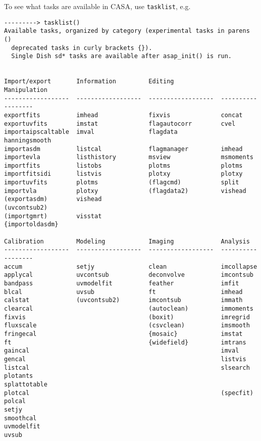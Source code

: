 To see what tasks are available in CASA, use {\tt tasklist}, e.g.
\small
\begin{verbatim}
---------> tasklist()
Available tasks, organized by category (experimental tasks in parens ()
  deprecated tasks in curly brackets {}).
  Single Dish sd* tasks are available after asap_init() is run. 


Import/export       Information         Editing             Manipulation      
------------------  ------------------  ------------------  ------------------
exportfits          imhead              fixvis              concat            
exportuvfits        imstat              flagautocorr        cvel              
importaipscaltable  imval               flagdata            hanningsmooth     
importasdm          listcal             flagmanager         imhead            
importevla          listhistory         msview              msmoments         
importfits          listobs             plotms              plotms            
importfitsidi       listvis             plotxy              plotxy            
importuvfits        plotms              (flagcmd)           split             
importvla           plotxy              (flagdata2)         vishead           
(exportasdm)        vishead                                 (uvcontsub2)      
(importgmrt)        visstat                                                   
{importoldasdm}                                                               

Calibration         Modeling            Imaging             Analysis          
------------------  ------------------  ------------------  ------------------
accum               setjy               clean               imcollapse        
applycal            uvcontsub           deconvolve          imcontsub         
bandpass            uvmodelfit          feather             imfit             
blcal               uvsub               ft                  imhead            
calstat             (uvcontsub2)        imcontsub           immath            
clearcal                                (autoclean)         immoments         
fixvis                                  (boxit)             imregrid          
fluxscale                               (csvclean)          imsmooth          
fringecal                               {mosaic}            imstat            
ft                                      {widefield}         imtrans           
gaincal                                                     imval             
gencal                                                      listvis           
listcal                                                     slsearch          
plotants                                                    splattotable      
plotcal                                                     (specfit)         
polcal                                                                        
setjy                                                                         
smoothcal                                                                     
uvmodelfit                                                                    
uvsub                                                                         


\end{verbatim}
